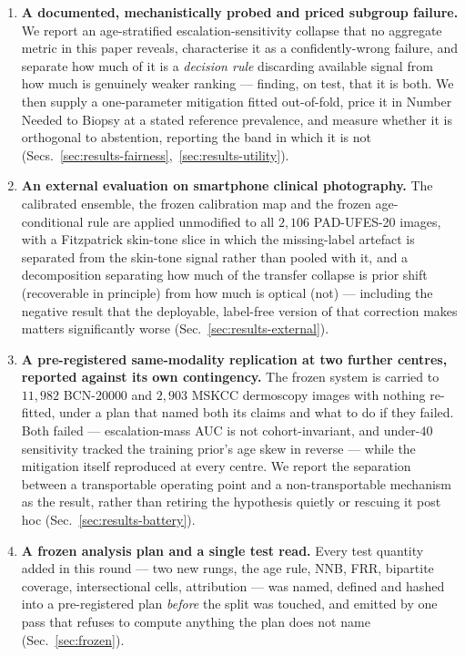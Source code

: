 \documentclass[journal]{IEEEtran}
\begin{document}
\begin{enumerate}
required to bound it rather than pre-committing to a bound
(Sec.~\ref{sec:results-conformal}).
\item \textbf{A documented, mechanistically probed and priced subgroup failure.} We report an
age-stratified escalation-sensitivity collapse that no aggregate metric in this paper
reveals, characterise it as a confidently-wrong failure, and separate how much of it is a
\emph{decision rule} discarding available signal from how much is genuinely weaker ranking
--- finding, on test, that it is both. We then supply a one-parameter mitigation fitted
out-of-fold, price it in Number Needed to Biopsy at a stated reference prevalence, and
measure whether it is orthogonal to abstention, reporting the band in which it is not
(Secs.~\ref{sec:results-fairness},~\ref{sec:results-utility}).
\item \textbf{An external evaluation on smartphone clinical photography.} The calibrated
ensemble, the frozen calibration map and the frozen age-conditional rule are applied
unmodified to all $2{,}106$ PAD-UFES-20 images, with a Fitzpatrick skin-tone slice in which
the missing-label artefact is separated from the skin-tone signal rather than pooled with it,
and a decomposition separating how much of the transfer collapse is prior shift (recoverable
in principle) from how much is optical (not) --- including the negative result that the
deployable, label-free version of that correction makes matters significantly worse
(Sec.~\ref{sec:results-external}).
\item \textbf{A pre-registered same-modality replication at two further centres, reported
against its own contingency.} The frozen system is carried to $11{,}982$ BCN-20000 and
$2{,}903$ MSKCC dermoscopy images with nothing re-fitted, under a plan that named both its
claims and what to do if they failed. Both failed --- escalation-mass AUC is not
cohort-invariant, and under-$40$ sensitivity tracked the training prior's age skew in reverse
--- while the mitigation itself reproduced at every centre. We report the separation between a
transportable operating point and a non-transportable mechanism as the result, rather than
retiring the hypothesis quietly or rescuing it post hoc (Sec.~\ref{sec:results-battery}).
\item \textbf{A frozen analysis plan and a single test read.} Every test quantity added in
this round --- two new rungs, the age rule, NNB, FRR, bipartite coverage, intersectional
cells, attribution --- was named, defined and hashed into a pre-registered plan
\emph{before} the split was touched, and emitted by one pass that refuses to compute anything
the plan does not name (Sec.~\ref{sec:frozen}).
\end{enumerate}
\end{document}
